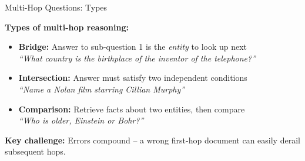 \documentclass[11pt,compress,t,notes=noshow, xcolor=table]{beamer}
\begin{document}
\begin{frame}{Multi-Hop Questions: Types}

\vfill

\textbf{Types of multi-hop reasoning:}

\vspace{0.3em}

\begin{itemize}
    \item \textbf{Bridge:} Answer to sub-question 1 is the \textit{entity} to look up next\\
          {\small\textit{``What country is the birthplace of the inventor of the telephone?''}}
    \vspace{0.3em}
    \item \textbf{Intersection:} Answer must satisfy two independent conditions\\
          {\small\textit{``Name a Nolan film starring Cillian Murphy''}}
    \vspace{0.3em}
    \item \textbf{Comparison:} Retrieve facts about two entities, then compare\\
          {\small\textit{``Who is older, Einstein or Bohr?''}}
\end{itemize}

\vspace{1em}

\textbf{Key challenge:} Errors compound -- a wrong first-hop document can easily derail subsequent hops.

\vfill

\end{frame}
\end{document}
